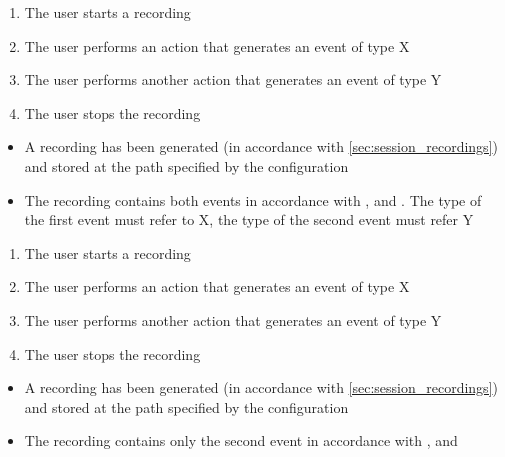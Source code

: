 \begin{tests}
    {\begin{enumerate}
        \item The \gls{user} starts a recording
        \item The \gls{user} performs an action that generates an \gls{event} of type X
        \item The \gls{user} performs another action that generates an \gls{event} of type Y
        \item The \gls{user} stops the recording
    \end{enumerate}}
    {\begin{itemize}
        \item A recording has been generated (in accordance with \ref{sec:session_recordings}) and stored at the path specified by the configuration
        \item The recording contains both events in accordance with ,  and . The type of the first event must refer to X, the type of the second event must refer Y
    \end{itemize}}

    {\begin{enumerate}
        \item The \gls{user} starts a recording
        \item The \gls{user} performs an action that generates an \gls{event} of type X
        \item The \gls{user} performs another action that generates an \gls{event} of type Y
        \item The \gls{user} stops the recording
    \end{enumerate}}
    {\begin{itemize}
        \item A recording has been generated (in accordance with \ref{sec:session_recordings}) and stored at the path specified by the configuration
        \item The recording contains only the second event in accordance with ,  and 
    \end{itemize}}


\end{tests}
